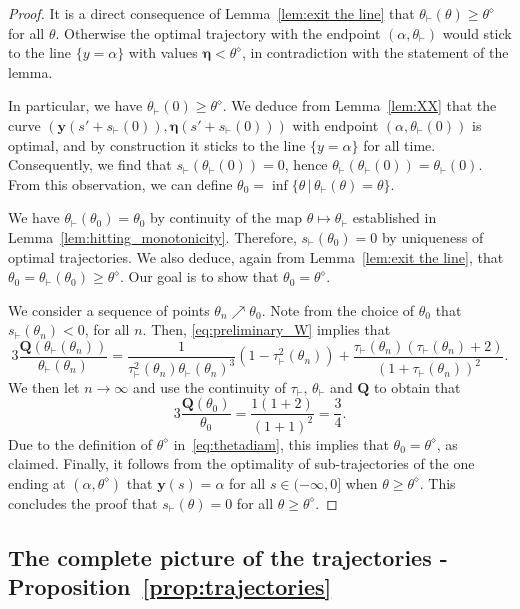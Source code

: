 \documentclass[AHL,Unicode,longabstracts]{cedram}
\newcommand{\bQ}{\mathbf{Q}}
\newcommand{\by}{\mathbf{y}}
\newcommand{\beeta}{\boldsymbol{\eta}}
\newcommand{\1}{\mathds{1}}
\newcommand{\sh}{s_{\vdash}}
\newcommand{\tauh}{\tau_{\vdash}}
\newcommand{\Thetastar}{\theta^{\diamond}}
\newcommand{\shh}{s_{\vdash}}
\newcommand{\htheta}{\theta_{\vdash}}
\begin{document}
\begin{proof}
It is a direct consequence of Lemma~\ref{lem:exit the line} that $\htheta(\theta)\geq \Thetastar$ for all $\theta$. Otherwise the optimal trajectory with the endpoint $(\alpha,\htheta)$ would stick to the line $\{y=\alpha\}$ with values $\beeta<\Thetastar$, in contradiction with the statement of the lemma.


In particular, we have $\htheta(0) \geq \Thetastar$. We deduce from Lemma~\ref{lem:XX} that the curve $(\by(s' + \shh(0)),\beeta(s' + \shh(0)))$ with endpoint $(\alpha,\htheta(0))$ is optimal, and by construction it sticks to the line $\{y=\alpha\}$ for all time. Consequently, we find that $\shh(\htheta(0)) = 0$, hence $\htheta(\htheta(0)) = \htheta(0)$. From this observation, we can define $\theta_0=\inf \{\theta \,| \, \htheta(\theta)=\theta\}$.

We have $\htheta(\theta_0) = \theta_0$ by continuity of the map $\theta\mapsto\htheta$ established in Lemma~\ref{lem:hitting_monotonicity}. Therefore, $\shh(\theta_0) = 0$ by uniqueness of optimal trajectories. We also deduce, again from Lemma~\ref{lem:exit the line}, that $\theta_0 = \htheta(\theta_0) \geq \Thetastar$. Our goal is to show that $\theta_0 = \Thetastar$.



We consider a sequence of points $\theta_n \nearrow \theta_0$. Note from the choice of $\theta_0$ that $\sh(\theta_n)<0$, for all $n$. Then, \eqref{eq:preliminary_W} implies that
\[
3\frac{\bQ\left(\htheta(\theta_n)\right)}{\htheta(\theta_n)} = \frac{1}{\tauh^2(\theta_n)\htheta(\theta_n)^3}\left(1-\tauh^2(\theta_n)\right) + \frac{\tauh(\theta_n) \left(\tauh(\theta_n)+2\right)}{\left(1+\tauh(\theta_n)\right)^2}.
\]
We then let $n\to \infty$ and use the continuity of $\tauh$, $\htheta$ and $\bQ$ to obtain that
\[
3\frac{\bQ(\theta_0)}{\theta_0} = \frac{1 (1 + 2)}{(1 + 1)^2} = \frac{3}{4}.
\]
Due to the definition of $\Thetastar$ in~\eqref{eq:thetadiam}, this implies that $\theta_0 = \Thetastar$, as claimed. Finally, it follows from the optimality of sub-trajectories of the one ending at $(\alpha,\Thetastar)$ that $\by(s) = \alpha$ for all $s\in (-\infty,0]$ when $\theta\geq \Thetastar$. This concludes the proof that $\shh(\theta) = 0$ for all $\theta\geq \Thetastar$.
\end{proof}



\subsection{The complete picture of the trajectories - Proposition~\ref{prop:trajectories}}\label{sec:proposition_compilation}
\end{document}
